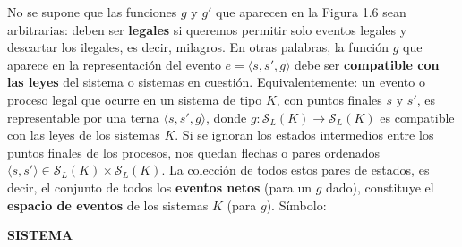 {No se supone que las funciones $g$ y $g'$ que aparecen en la Figura 1.6 sean arbitrarias: deben ser \textbf{legales} si queremos permitir solo eventos legales y descartar los ilegales, es decir, milagros. En otras palabras, la función $g$ que aparece en la representación del evento $e = \langle s, s', g \rangle$ debe ser \textbf{compatible con las leyes} del sistema o sistemas en cuestión. Equivalentemente: un evento o proceso legal que ocurre en un sistema de tipo $K$, con puntos finales $s$ y $s'$, es representable por una terna $\langle s, s', g \rangle$, donde $g: \mathcal{S}_L(K) \rightarrow \mathcal{S}_L(K)$ es compatible con las leyes de los sistemas $K$. Si se ignoran los estados intermedios entre los puntos finales de los procesos, nos quedan flechas o pares ordenados $\langle s, s' \rangle \in \mathcal{S}_L(K) \times \mathcal{S}_L(K)$. La colección de todos estos pares de estados, es decir, el conjunto de todos los \textbf{eventos netos} (para un $g$ dado), constituye el \textbf{espacio de eventos} de los sistemas $K$ (para $g$). Símbolo:
}

\newpage
\fancyhf{}
\fancyhead[r]{\thepage}
\begin{center}
{\fontsize{13}{16}\selectfont \textbf{SISTEMA}}
\end{center}
\vspace{0.5cm}


